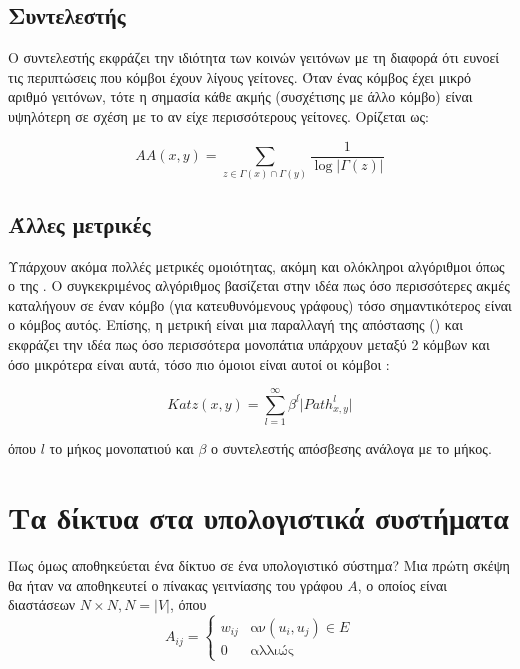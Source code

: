 \subsection{Συντελεστής }

Ο συντελεστής  εκφράζει την ιδιότητα των κοινών γειτόνων με τη διαφορά 
ότι ευνοεί τις περιπτώσεις που κόμβοι έχουν λίγους γείτονες. Όταν ένας κόμβος έχει μικρό
αριθμό γειτόνων, τότε η σημασία κάθε ακμής (συσχέτισης με άλλο κόμβο) είναι υψηλότερη 
σε σχέση με το αν είχε περισσότερους γείτονες\cite{Adamic2003FriendsAN}. Ορίζεται ως:

\begin{equation}
    AA(x,y) = \sum_{z \in \Gamma(x)\cap\Gamma(y)} \frac{1}{\log|\Gamma(z)|}
\end{equation}

\subsection{Άλλες μετρικές}

Υπάρχουν ακόμα πολλές μετρικές ομοιότητας, ακόμη και ολόκληροι αλγόριθμοι όπως ο 
 της  \cite{ilprints422}. O συγκεκριμένος αλγόριθμος βασίζεται 
στην ιδέα πως όσο περισσότερες ακμές καταλήγουν σε έναν κόμβο (για κατευθυνόμενους γράφους)
τόσο σημαντικότερος είναι ο κόμβος αυτός. Επίσης, η μετρική  είναι μια παραλλαγή
της απόστασης () και εκφράζει την ιδέα πως όσο περισσότερα μονοπάτια υπάρχουν
μεταξύ 2 κόμβων και όσο μικρότερα είναι αυτά, τόσο πιο όμοιοι είναι αυτοί οι κόμβοι 
\cite{RePEc:spr:psycho:v:18:y:1953:i:1:p:39-43}:

\begin{equation}
    Katz(x,y) = \sum_{l=1}^{\infty} \beta^l\dot|Path_{x,y}^l|
\end{equation}

όπου \(l\) το μήκος μονοπατιού και \(\beta\) ο συντελεστής απόσβεσης ανάλογα με το μήκος.

\section{Τα δίκτυα στα υπολογιστικά συστήματα}

Πως όμως αποθηκεύεται ένα δίκτυο σε ένα υπολογιστικό σύστημα? Μια πρώτη σκέψη θα ήταν να
αποθηκευτεί ο πίνακας γειτνίασης του γράφου \(A\), ο οποίος είναι διαστάσεων 
\(N \times N ,N = |V|\), όπου 
\begin{equation}
    A_{ij} = 
    \begin{cases}
        w_{ij} & \text{αν} (u_i,u_j) \in E \\
        0 & \text{αλλιώς}
    \end{cases}
\end{equation}


